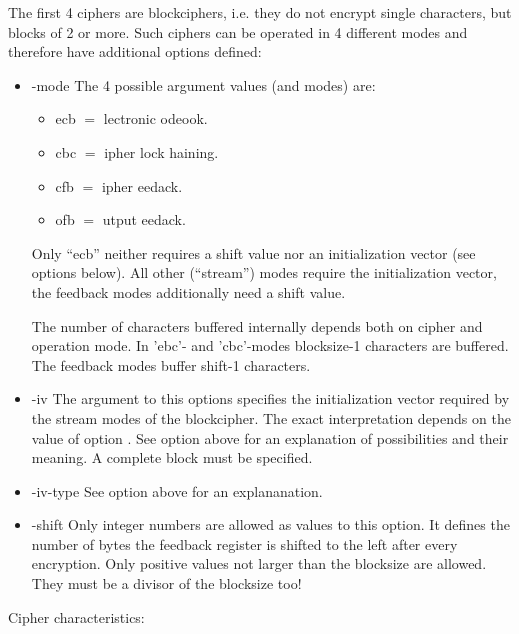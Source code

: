 \documentclass {report}
\begin{document}
The first 4 ciphers are blockciphers, i.e. they do not encrypt single
characters, but blocks of 2 or more. Such ciphers can be operated in 4
different modes and therefore have additional options defined:

\begin {itemize}
\item [-mode]	The 4 possible argument values (and modes) are:

	\begin {itemize}
	\item [ecb]	$=$ lectronic odeook.
	\item [cbc]	$=$ ipher lock haining.
	\item [cfb]	$=$ ipher eedack.
	\item [ofb]	$=$ utput eedack.
	\end   {itemize}

		Only ``ecb'' neither requires a shift value nor an
		initialization vector (see options below). All other
		(``stream'') modes require the initialization vector,
		the feedback modes additionally need a shift value.

		The number of characters buffered internally depends
		both on cipher and operation mode. In 'ebc'- and
		'cbc'-modes blocksize-1 characters are buffered. The
		feedback modes buffer shift-1 characters.


\item [-iv]	The argument to this options specifies the
		initialization vector required by the stream modes of
		the blockcipher. The exact interpretation depends
		on the value of option . See option
		 above for an explanation of possibilities
		and their meaning. A complete block must be specified.

\item [-iv-type]	See option  above for an
			explananation.

\item [-shift]	Only integer numbers are allowed as values to this
		option. It defines the number of bytes the feedback
		register is shifted to the left after every
		encryption. Only positive values not larger than the
		blocksize are allowed. They must be a divisor of the
		blocksize too!
\end   {itemize}


Cipher characteristics:
\end{document}
